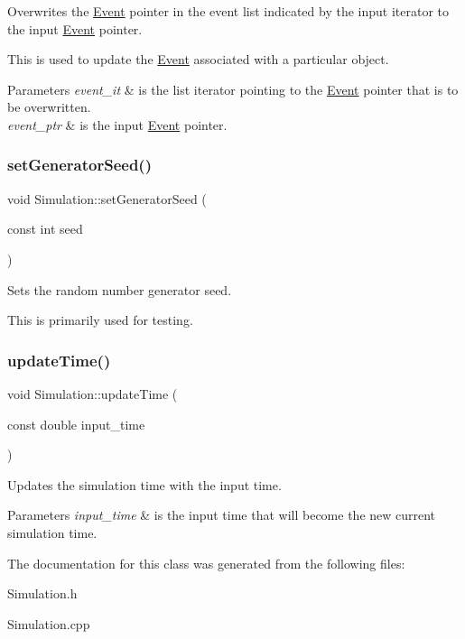 Overwrites the \hyperlink{class_event}{Event} pointer in the event list indicated by the input iterator to the input \hyperlink{class_event}{Event} pointer. 

This is used to update the \hyperlink{class_event}{Event} associated with a particular object. 
\begin{DoxyParams}{Parameters}
{\em event\+\_\+it} & is the list iterator pointing to the \hyperlink{class_event}{Event} pointer that is to be overwritten. \\
\hline
{\em event\+\_\+ptr} & is the input \hyperlink{class_event}{Event} pointer. \\
\hline
\end{DoxyParams}
\mbox{\label{class_simulation_a1a825b9da67da43104137662694655bd}} 
\subsubsection{\texorpdfstring{set\+Generator\+Seed()}{setGeneratorSeed()}}
{\footnotesize\ttfamily void Simulation\+::set\+Generator\+Seed (\begin{DoxyParamCaption}\item[{const int}]{seed }\end{DoxyParamCaption})}

Sets the random number generator seed.

This is primarily used for testing. \mbox{\label{class_simulation_a1affa7d0725c3d10663095619dcb9208}} 
\subsubsection{\texorpdfstring{update\+Time()}{updateTime()}}
{\footnotesize\ttfamily void Simulation\+::update\+Time (\begin{DoxyParamCaption}\item[{const double}]{input\+\_\+time }\end{DoxyParamCaption})\hspace{0.3cm}{\ttfamily [protected]}}



Updates the simulation time with the input time. 


\begin{DoxyParams}{Parameters}
{\em input\+\_\+time} & is the input time that will become the new current simulation time. \\
\hline
\end{DoxyParams}


The documentation for this class was generated from the following files\+:\begin{DoxyCompactItemize}
\item 
Simulation.\+h\item 
Simulation.\+cpp\end{DoxyCompactItemize}
